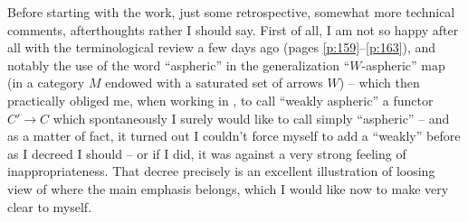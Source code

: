 Before starting with the work, just some retrospective, somewhat more
technical comments, afterthoughts rather I should say. First of all, I
am not so happy after all with the terminological review a few days
ago (pages \ref{p:159}--\ref{p:163}), and notably the use
of the word ``aspheric'' in the generalization ``$W$-aspheric'' map
(in a category $M$ endowed with a saturated set of arrows $W$) --
which then practically obliged me, when working in \Cat, to call
``weakly aspheric'' a functor $C'\to C$ which spontaneously I surely
would like to call simply ``aspheric'' -- and as a matter of fact, it
turned out I couldn't force myself to add a ``weakly'' before as I
decreed I should -- or if I did, it was against a very strong feeling
of inappropriateness. That decree precisely is an excellent
illustration of loosing view of where the main emphasis belongs, which
I would like now to make very clear to myself.

